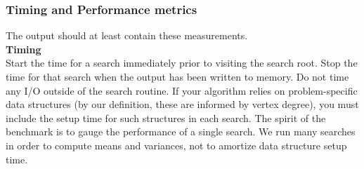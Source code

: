 \subsubsection{Timing and Performance metrics}
The output should at least contain these measurements. \\ 
\textbf{Timing} \\
Start the time for a search immediately prior to visiting the search root. Stop the time for that search when the output has been written to memory. Do not time any I/O outside of the search routine. If your algorithm relies on problem-specific data structures (by our definition, these are informed by vertex degree), you must include the setup time for such structures in each search. The spirit of the benchmark is to gauge the performance of a single search. We run many searches in order to compute means and variances, not to amortize data structure setup time.


